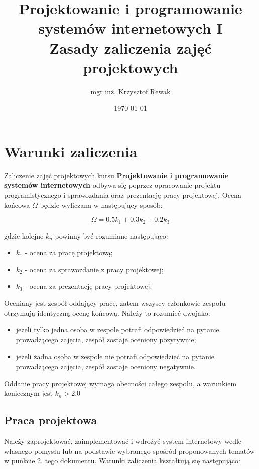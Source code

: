 \documentclass{article}
\title{
	Projektowanie i programowanie systemów internetowych I\\
	\Huge{Zasady zaliczenia zajęć projektowych}
}
\author{mgr inż. Krzysztof Rewak}
\date{\today}
\begin{document}
	\maketitle

	\section{Warunki zaliczenia}
	Zaliczenie zajęć projektowych kursu \textbf{Projektowanie i programowanie systemów internetowych} odbywa się poprzez opracowanie projektu programistycznego i sprawozdania oraz prezentację pracy projektowej. Ocena końcowa $\Omega$ będzie wyliczana w następujący sposób:
	
	\begin{equation} \label{eq:someequation}
		\Omega = 0.5k_1 + 0.3k_2 + 0.2k_3
	\end{equation}
	
	gdzie kolejne $k_n$ powinny być rozumiane następująco:
	
	\begin{itemize}
		\item $k_1$ - ocena za pracę projektową;
		\item $k_2$ - ocena za sprawozdanie z pracy projektowej;
		\item $k_3$ - ocena za prezentację pracy projektowej.
	\end{itemize}
	
	Oceniany jest zespół oddający pracę, zatem wszyscy członkowie zespołu otrzymują identyczną ocenę końcową. Należy to rozumieć dwojako:
	\begin{itemize}
		\item jeżeli tylko jedna osoba w zespole potrafi odpowiedzieć na pytanie prowadzącego zajęcia, zespół zostaje oceniony pozytywnie;
		\item jeżeli żadna osoba w zespole nie potrafi odpowiedzieć na pytanie prowadzącego zajęcia, zespół zostaje oceniony negatywnie.
	\end{itemize}
	
	Oddanie pracy projektowej wymaga obecności całego zespołu, a warunkiem koniecznym jest $k_n > 2.0$
	
	\subsection{Praca projektowa}
	Należy zaprojektować, zaimplementować i wdrożyć system internetowy wedle własnego pomysłu lub na podstawie wybranego spośród proponowanych tematów w punkcie 2. tego dokumentu. Warunki zaliczenia kształtują się następująco:
	
\end{document}
